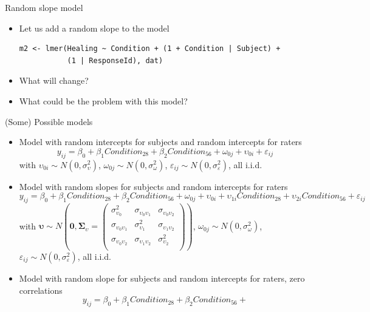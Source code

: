 \documentclass[aspectratio=169]{beamer}
\newcommand{\gvect}[1]{\boldsymbol{#1}}
\newcommand{\gmat}[1]{\boldsymbol{#1}}
\begin{document}
\begin{frame}[fragile]{Random slope model}
  \begin{itemize}
    \item Let us add a random slope to the model
\begin{lstlisting}
m2 <- lmer(Healing ~ Condition + (1 + Condition | Subject) +
           (1 | ResponseId), dat)
\end{lstlisting}
\pause
    \item What will change?
\pause
    \item What could be the problem with this model?
  \end{itemize}
\end{frame}

\begin{frame}[<+->]{(Some) Possible models}
  \small
  \begin{itemize}
    \item Model with random intercepts for subjects and random intercepts for
      raters
  \[
    y_{ij} = \beta_0 + \beta_1 Condition_{28} + \beta_2 Condition_{56} +
      \omega_{0j} + \upsilon_{0i} + \varepsilon_{ij} 
  \]
\small
      with $\upsilon_{0i} \sim N(0, \sigma_{\upsilon}^2)$,
      $\omega_{0j} \sim N(0, \sigma_{\omega}^2)$, $\varepsilon_{ij} \sim N(0,
  \sigma_{\varepsilon}^2)$, all i.i.d. 
    \item Model with random slopes for subjects and random intercepts for
      raters
  \[
    y_{ij} = \beta_0 + \beta_1 Condition_{28} + \beta_2 Condition_{56} +
      \omega_{0j} + \upsilon_{0i} + \upsilon_{1i} Condition_{28} +
      \upsilon_{2i} Condition_{56} + \varepsilon_{ij} 
  \]
\small
with $\gvect{\upsilon} \sim N\left(\gvect{0}, \gmat{\Sigma}_{\upsilon} = 
    \begin{pmatrix}
      \sigma^2_{\upsilon_0} & \sigma_{\upsilon_0\upsilon_1}  & \sigma_{\upsilon_0\upsilon_2}\\
      \sigma_{\upsilon_0\upsilon_1} & \sigma^2_{\upsilon_1}  & \sigma_{\upsilon_1\upsilon_2}\\
      \sigma_{\upsilon_0\upsilon_2} & \sigma_{\upsilon_1\upsilon_2} & \sigma^2_{\upsilon_2} \\
    \end{pmatrix}\right)$,
      $\omega_{0j} \sim N(0, \sigma_{\omega}^2)$, $\varepsilon_{ij} \sim N(0,
  \sigma_{\varepsilon}^2)$, all i.i.d. 
    \item Model with random slope for subjects and random intercepts for
      raters, zero correlations
  \[
    y_{ij} = \beta_0 + \beta_1 Condition_{28} + \beta_2 Condition_{56} +
\]
\end{itemize}
\end{frame}
\end{document}
